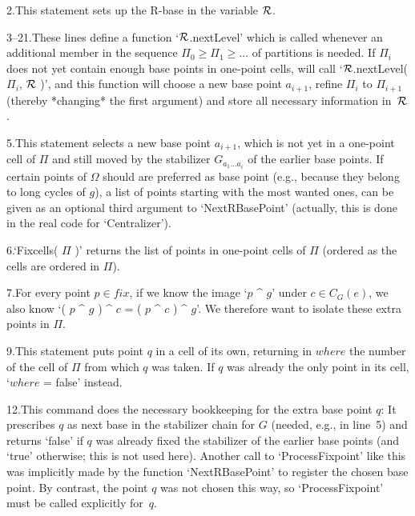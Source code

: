 2.\enspace This statement sets up the R-base in the variable ${\cal R}$.

3--21.\enspace These lines define  a  function `${\cal R}$.nextLevel' which  is
called  whenever an  additional member in   the sequence $\Pi_0 \ge \Pi_1
\ge\ldots$ of   partitions is needed.  If  $\Pi_i$ does   not yet contain
enough base points in one-point  cells, {\GAP} will call `${\cal R}$.nextLevel(
$\Pi_i$, ${\cal R}$  )',  and this  function   will choose   a  new base  point
$a_{i+1}$, refine $\Pi_i$  to  $\Pi_{i+1}$ (thereby *changing*  the first
argument) and store all necessary information in~${\cal R}$.

5.\enspace  This statement selects a new   base point $a_{i+1}$, which is
not yet  in a one-point  cell of $\Pi$ and still  moved by the stabilizer
$G_{a_1\ldots a_i}$  of the  earlier base points.   If certain points  of
$\Omega$ should are preferred as base point (e.g., because they belong to
long cycles of $g$), a list of points starting with the most wanted ones,
can be given as an optional third argument to `NextRBasePoint' (actually,
this is done in the real code for `Centralizer').

6.\enspace  `Fixcells( $\Pi$ )' returns the  list of  points in one-point
cells of $\Pi$ (ordered as the cells are ordered in $\Pi$).

7.\enspace For every point $p\in fix$,  if we know the  image `$p$ ^ $g$'
under $c\in C_G(e)$, we also know `( $p$ ^ $g$ ) ^ $c$ = (  $p$ ^ $c$ ) ^
$g$'. We therefore want to isolate these extra points in $\Pi$.

9.\enspace This statement puts point $q$ in a cell  of its own, returning
in $where$ the number of the cell  of $\Pi$ from  which $q$ was taken. If
$q$ was already the only point in its cell, `$where$ = false' instead.

12.\enspace This  command does the   necessary bookkeeping for  the extra
base point $q$:  It prescribes $q$ as next  base in the  stabilizer chain
for $G$ (needed, e.g., in line~5) and  returns `false' if $q$ was already
fixed the  stabilizer of the  earlier base points (and  `true' otherwise;
this is not used here).  Another call to  `ProcessFixpoint' like this was
implicitly  made by the  function  `NextRBasePoint' to register the chosen
base  point. By contrast,  the  point $q$  was  not chosen  this  way, so
`ProcessFixpoint' must be called explicitly for~$q$.

